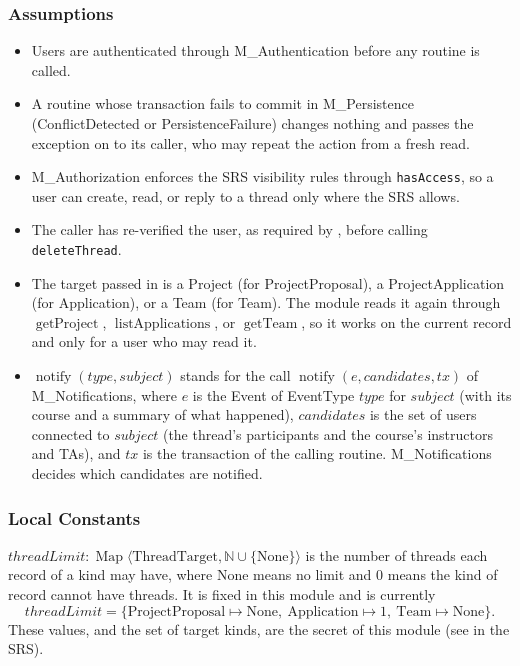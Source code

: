 \documentclass[12pt, titlepage]{article}
\newcommand{\descriptiveid}[1]{\texttt{\detokenize{#1}}}
\newcommand{\srsurl}{https://ayushpatel2026.github.io/Keystone/SRS/SRS.pdf}
\newcommand{\srsref}[1]{\href{\srsurl\#nameddest=#1}{\descriptiveid{#1}}}
\begin{document}
\subsubsection{Assumptions}

\begin{itemize}
    \item Users are authenticated through M\_Authentication before any routine is called.
    \item A routine whose transaction fails to commit in M\_Persistence (ConflictDetected or PersistenceFailure) changes nothing and passes the exception on to its caller, who may repeat the action from a fresh read.
    \item M\_Authorization enforces the SRS visibility rules through \texttt{hasAccess}, so a user can create, read, or reply to a thread only where the SRS allows.
    \item The caller has re-verified the user, as required by \srsref{FR_ReverifyUsers}, before calling \texttt{deleteThread}.
    \item The target passed in is a Project (for ProjectProposal), a ProjectApplication (for Application), or a Team (for Team). The module reads it again through $\operatorname{getProject}$, $\operatorname{listApplications}$, or $\operatorname{getTeam}$, so it works on the current record and only for a user who may read it.
    \item $\operatorname{notify}(type,subject)$ stands for the call $\operatorname{notify}(e,\mathit{candidates},tx)$ of M\_Notifications, where $e$ is the Event of EventType $type$ for $subject$ (with its course and a summary of what happened), $\mathit{candidates}$ is the set of users connected to $subject$ (the thread's participants and the course's instructors and TAs), and $tx$ is the transaction of the calling routine. M\_Notifications decides which candidates are notified.
\end{itemize}

\subsubsection{Local Constants}

$\mathit{threadLimit}:\operatorname{Map}\langle\text{ThreadTarget},\mathbb{N}\cup\{\text{None}\}\rangle$ is the number of threads each record of a kind may have, where None means no limit and 0 means the kind of record cannot have threads. It is fixed in this module and is currently
\[
\mathit{threadLimit}=\{\text{ProjectProposal}\mapsto\text{None},\ \text{Application}\mapsto 1,\ \text{Team}\mapsto\text{None}\}.
\]
These values, and the set of target kinds, are the secret of this module (see \srsref{LC_ThreadTargets} in the SRS).
\end{document}
